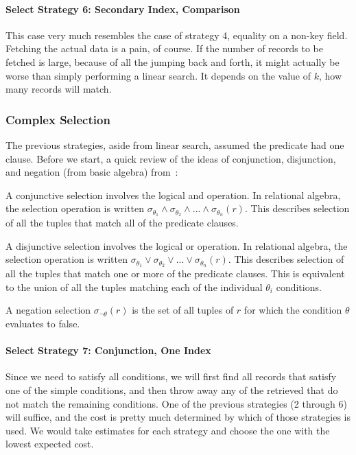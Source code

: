\documentclass[a4paper]{report}
\begin{document}
\paragraph*{Select Strategy 6: Secondary Index, Comparison}
This case very much resembles the case of strategy 4, equality on a non-key field. Fetching the actual data is a pain, of course. If the number of records to be fetched is large, because of all the jumping back and forth, it might actually be worse than simply performing a linear search.  It depends on the value of $k$, how many records will match. 

\subsubsection*{Complex Selection}

The previous strategies, aside from linear search, assumed the predicate had one clause. Before we start, a quick review of the ideas of conjunction, disjunction, and negation (from basic algebra) from~\cite{dsc}:

A conjunctive selection involves the logical and operation. In relational algebra, the selection operation is written $\sigma_{\theta_{1}} \wedge \sigma_{\theta_{2}} \wedge ... \wedge \sigma_{\theta _{n}}( r )$. This describes selection of all the tuples that match all of the predicate clauses.

A disjunctive selection involves the logical or operation. In relational algebra, the selection operation is written $\sigma_{\theta_{1}} \vee \sigma_{\theta_{2}} \vee ... \vee \sigma_{\theta _{n}}( r )$. This describes selection of all the tuples that match one or more of the predicate clauses. This is equivalent to the union of all the tuples matching each of the individual $\theta_{i}$ conditions.

A negation selection $\sigma_{\neg \theta}(r)$ is the set of all tuples of $r$ for which the condition $\theta$ evaluates to false. 

\paragraph{Select Strategy 7: Conjunction, One Index}
Since we need to satisfy all conditions, we will first find all records that satisfy one of the simple conditions, and then throw away any of the retrieved that do not match the remaining conditions. One of the previous strategies (2 through 6) will suffice, and the cost is pretty much determined by which of those strategies is used. We would take estimates for each strategy and choose the one with the lowest expected cost.
\end{document}
